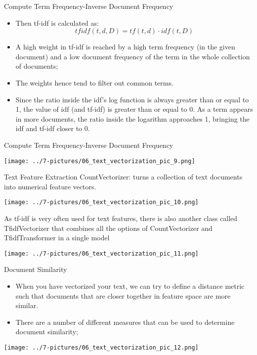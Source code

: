 \documentclass[11pt]{beamer}
\newcommand{\highlight}[1]{%
  \colorbox{yellow!100}{$\displaystyle#1$}}
\begin{document}
\begin{frame}{Compute Term Frequency-Inverse Document Frequency}
	\begin{itemize}
		\item Then tf-idf is calculated as: \begin{equation} tfidf(t,d,D) = tf(t,d) \cdot idf(t,D)\end{equation}
		\item A high weight in tf-idf is reached by a \highlight{\text{high term frequency}} (in the given document) and a \highlight{\text{low document frequency}} of the term in the whole collection of documents; 
\item The weights hence tend to filter out common terms. 
		\item Since the ratio inside the idf's log function is always greater than or equal to 1, the value of idf (and tf-idf) is greater than or equal to 0. As a term appears in more documents, the ratio inside the logarithm approaches 1, bringing the idf and tf-idf closer to 0.
	\end{itemize}
\end{frame}
\begin{frame}{Compute Term Frequency-Inverse Document Frequency}
	\begin{center}
	\texttt{[image: ../7-pictures/06\_text\_vectorization\_pic\_9.png]}
	\end{center}
\end{frame}
\begin{frame}{Text Feature Extraction}
	CountVectorizer: turns a collection of text documents into numerical feature vectors.
	\begin{center}
	\texttt{[image: ../7-pictures/06\_text\_vectorization\_pic\_10.png]}
	\end{center}
	As tf-idf is very often used for text features, there is also another class called TfidfVectorizer that combines all the options of CountVectorizer and TfidfTransformer in a single model
	\begin{center}
	\texttt{[image: ../7-pictures/06\_text\_vectorization\_pic\_11.png]}
	\end{center}
\end{frame}
\begin{frame}{Document Similarity}
	\begin{itemize}
		\item When you have vectorized your text, we can try to define a distance metric such that documents that are closer together in feature space are more similar.
		\item There are a number of different measures that can be used to determine document similarity; 
	\end{itemize}
	\begin{center}
	\texttt{[image: ../7-pictures/06\_text\_vectorization\_pic\_12.png]}
	\end{center}
\end{frame}
\end{document}
